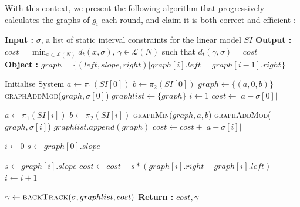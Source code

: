 \documentclass{article}
\theoremstyle{Definition}
\theoremstyle{definition}
\begin{document}
With this context, we present the following algorithm that progressively calculates the graphs of $g_i$ each round, and claim it is both correct and efficient : 

\begin{algorithm}
	\caption{$d_t$ Algorithm}
	\label{StampAlgo}
	\begin{algorithmic}
		
		\State \textbf{Input : }  $\sigma$, a list of static interval constraints for the linear model $SI$
		\State \textbf{Output : }  $cost = \min_{x \in \mathcal{L}(N)}{d_t(x, \sigma)}$, $\gamma \in \mathcal{L}(N)$ such that $d_t(\gamma, \sigma) = cost$\\
		
		\State \textbf{Object :} $graph = \{(left, slope, right) | graph[i].left = graph[i-1].right\}$
		
		\State Initialise System 
		\State $a \gets \pi_1(SI[0])$
		\State $b \gets \pi_2(SI[0])$		
		\State $graph \gets \{(a, 0, b)\}$
		\State \textsc{graphAddMod}($graph, \sigma[0]$)
		\State $graphlist \gets \{graph\}$
		\State $i \gets 1$
		\State $cost \gets |a - \sigma[0]|$
		
		\State $a \gets \pi_1(SI[i])$
		\State $b \gets \pi_2(SI[i])$		
		\State \textsc{graphMin}($graph, a, b$)
		\State \textsc{graphAddMod}($graph, \sigma[i]$)
		\State $graphlist.append(graph)$
		\State $cost \gets cost + |a - \sigma[i]|$
		\EndWhile
		
		\State $i \gets 0$ 
		\State $s \gets graph[0].slope$
		
		\State $s \gets graph[i].slope$ 
		\State $cost \gets cost + s * (graph[i].right - graph[i].left)$
		\State $i \gets i + 1$
		\EndWhile
		
		\State $\gamma \gets \textsc{backTrack}(\sigma, graphlist, cost)$
		\State \textbf{Return : } $cost, \gamma$
		\EndProcedure
		
	\end{algorithmic}
\end{algorithm}
\end{document}
